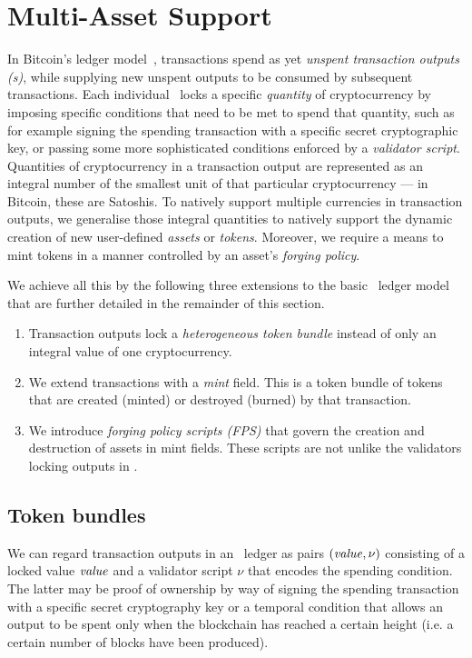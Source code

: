 \section{Multi-Asset Support}
\label{sec:multicurrency}

In Bitcoin's ledger model~\cite{Nakamoto,formal-model-of-bitcoin-transactions,Zahnentferner18-UTxO}, transactions spend as yet \emph{unspent transaction outputs \textup{(}\!\UTXO{}s\textup{)}}, while supplying new unspent outputs to be consumed by subsequent transactions.
Each individual \UTXO\ locks a specific \emph{quantity} of cryptocurrency by imposing specific conditions that need to be met to spend that quantity, such as for example signing the spending transaction with a specific secret cryptographic key, or passing some more sophisticated conditions enforced by a \emph{validator script}.
Quantities of cryptocurrency in a transaction output are represented as an integral number of the smallest unit of that particular cryptocurrency --- in Bitcoin, these are Satoshis.
To natively support multiple currencies in transaction outputs, we generalise those integral quantities to natively support the dynamic creation of new user-defined \emph{assets} or \emph{tokens}. Moreover, we require a means to mint tokens in a manner controlled by an asset's \emph{forging policy}.

We achieve all this by the following three extensions to the basic \UTXO\ ledger model that are further detailed in
the remainder of this section.
%
\begin{enumerate}
\item Transaction outputs lock a \emph{heterogeneous token bundle} instead of only an integral value of one cryptocurrency.
\item We extend transactions with a \emph{mint} field. This is a token bundle of tokens that are created (minted) or destroyed (burned) by that transaction.
\item We introduce \emph{forging policy scripts \textup{(}FPS\textup{)}} that govern the creation and destruction of assets in mint fields. These scripts are not unlike the validators locking outputs in \UTXO.
\end{enumerate}

\subsection{Token bundles}

We can regard transaction outputs in an \UTXO\ ledger as pairs \((\mathit{value}, \nu)\) consisting of a locked value $\mathit{value}$ and a validator script $\nu$ that encodes the spending condition. The latter may be proof of ownership by way of signing the spending transaction with a specific secret cryptography key or a temporal condition that allows an output to be spent only when the blockchain has reached a certain height (i.e. a certain number of blocks have been produced).

